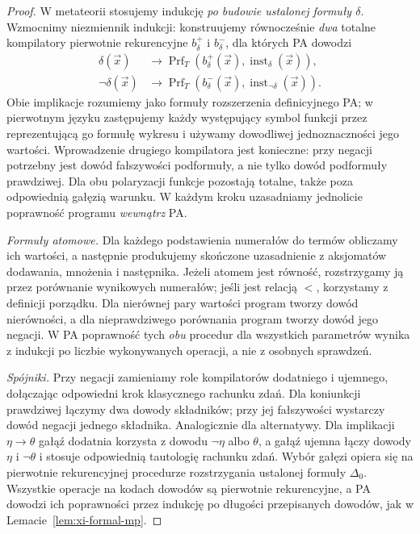 \begin{proof}
W metateorii stosujemy indukcję \emph{po budowie
ustalonej formuły $\delta$}. Wzmocnimy niezmiennik
indukcji: konstruujemy równocześnie \emph{dwa} totalne
kompilatory pierwotnie rekurencyjne $b_\delta^+$
i $b_\delta^-$, dla których PA dowodzi
\[
\begin{aligned}
\delta(\vec x)&\to
 \operatorname{Prf}_T(b_\delta^+(\vec x),
              \operatorname{inst}_\delta(\vec x)),\\
\neg\delta(\vec x)&\to
 \operatorname{Prf}_T(b_\delta^-(\vec x),
              \operatorname{inst}_{\neg\delta}(\vec x)).
\end{aligned}
\]
Obie implikacje rozumiemy jako formuły rozszerzenia
definicyjnego PA; w pierwotnym języku zastępujemy każdy
występujący symbol funkcji przez reprezentującą go formułę
wykresu i używamy dowodliwej jednoznaczności jego wartości.
Wprowadzenie drugiego kompilatora jest konieczne: przy negacji
potrzebny jest dowód fałszywości podformuły, a nie tylko
dowód podformuły prawdziwej. Dla obu polaryzacji funkcje
pozostają totalne, także poza odpowiednią gałęzią warunku.
W każdym kroku uzasadniamy jednolicie poprawność programu
\emph{wewnątrz} PA.

\emph{Formuły atomowe.} Dla każdego podstawienia
numerałów do termów obliczamy ich wartości,
a następnie produkujemy skończone uzasadnienie
z aksjomatów dodawania, mnożenia i następnika.
Jeżeli atomem jest równość, rozstrzygamy ją
przez porównanie wynikowych numerałów; jeśli
jest relacją $<$, korzystamy z definicji porządku.
Dla nierównej pary wartości program tworzy dowód
nierówności, a dla nieprawdziwego porównania
program tworzy dowód jego negacji. W PA poprawność
tych \emph{obu} procedur dla wszystkich parametrów
wynika z indukcji po liczbie wykonywanych operacji,
a nie z osobnych sprawdzeń.

\emph{Spójniki.} Przy negacji zamieniamy role
kompilatorów dodatniego i ujemnego, dołączając
odpowiedni krok klasycznego rachunku zdań. Dla
koniunkcji prawdziwej łączymy dwa dowody składników;
przy jej fałszywości wystarczy dowód negacji jednego
składnika. Analogicznie dla alternatywy. Dla implikacji
$\eta\to\theta$ gałąź dodatnia korzysta z dowodu
$\neg\eta$ albo $\theta$, a gałąź ujemna łączy dowody
$\eta$ i $\neg\theta$ i stosuje odpowiednią tautologię
rachunku zdań. Wybór gałęzi opiera się na pierwotnie
rekurencyjnej procedurze rozstrzygania ustalonej formuły
$\Delta_0$. Wszystkie operacje na kodach dowodów są
pierwotnie rekurencyjne, a PA dowodzi ich poprawności
przez indukcję po długości przepisanych dowodów,
jak w Lemacie~\ref{lem:xi-formal-mp}.


\end{proof}
